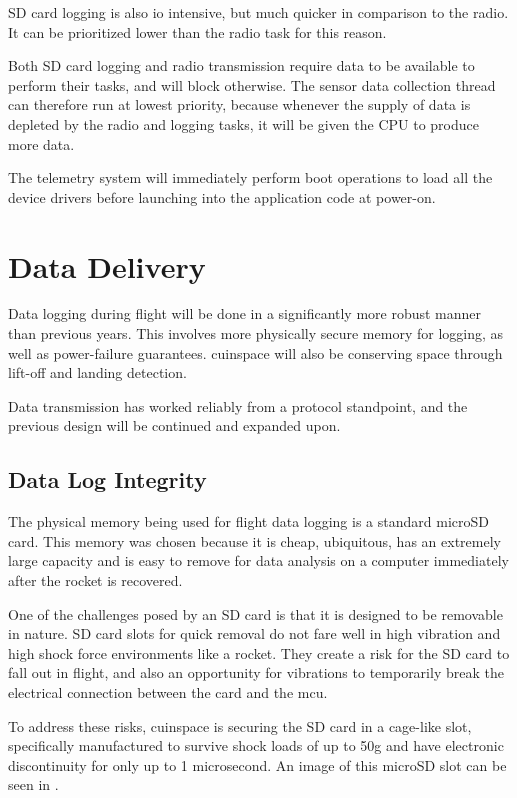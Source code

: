 SD card logging is also \gls{io} intensive, but much quicker in comparison to the radio. It can be prioritized lower
than the radio task for this reason.

Both SD card logging and radio transmission require data to be available to perform their tasks, and will block
otherwise. The sensor data collection thread can therefore run at lowest priority, because whenever the supply of data
is depleted by the radio and logging tasks, it will be given the CPU to produce more data.

The telemetry system will immediately perform boot operations to load all the device drivers before launching into the
application code at power-on.

\section{Data Delivery}

Data logging during flight will be done in a significantly more robust manner than previous years. This involves more
physically secure memory for logging, as well as power-failure guarantees. \Gls{cuinspace} will also be conserving
space through lift-off and landing detection.

Data transmission has worked reliably from a protocol standpoint, and the previous design will be continued and
expanded upon.

\subsection{Data Log Integrity}

The physical memory being used for flight data logging is a standard microSD card. This memory was chosen because it is
cheap, ubiquitous, has an extremely large capacity and is easy to remove for data analysis on a computer immediately
after the rocket is recovered.

One of the challenges posed by an SD card is that it is designed to be removable in nature. SD card slots for quick
removal do not fare well in high vibration and high shock force environments like a rocket. They create a risk for the
SD card to fall out in flight, and also an opportunity for vibrations to temporarily break the electrical connection
between the card and the \gls{mcu}.

To address these risks, \gls{cuinspace} is securing the SD card in a cage-like slot, specifically manufactured to
survive shock loads of up to 50g and have electronic discontinuity for only up to 1 microsecond.
\cite{sd-cage-datasheet} An image of this microSD slot can be seen in .

